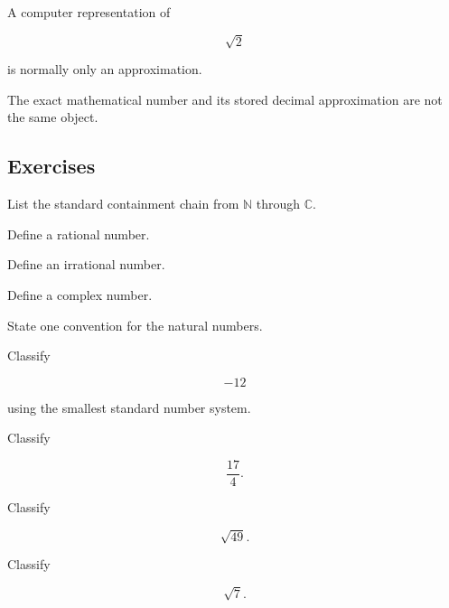 A computer representation of

\[
\boxed{
\sqrt2
}
\]

is normally only an approximation.

The exact mathematical number and its stored decimal approximation are not
the same object.

\subsection{Exercises}
\label{subsec:number-systems-reference-exercises}

\begin{exercise}[1]
List the standard containment chain from \(\mathbb{N}\) through
\(\mathbb{C}\).
\end{exercise}

\begin{exercise}[1]
Define a rational number.
\end{exercise}

\begin{exercise}[1]
Define an irrational number.
\end{exercise}

\begin{exercise}[1]
Define a complex number.
\end{exercise}

\begin{exercise}[1]
State one convention for the natural numbers.
\end{exercise}

\begin{exercise}[2]
Classify

\[
-12
\]

using the smallest standard number system.
\end{exercise}

\begin{exercise}[2]
Classify

\[
\frac{17}{4}.
\]
\end{exercise}

\begin{exercise}[2]
Classify

\[
\sqrt{49}.
\]
\end{exercise}

\begin{exercise}[2]
Classify

\[
\sqrt7.
\]
\end{exercise}

